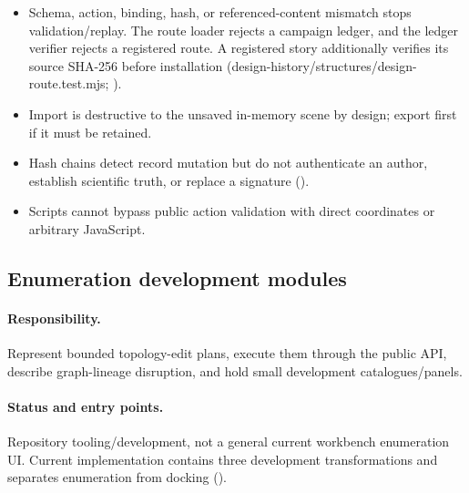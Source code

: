 \documentclass[11pt]{article}
\begin{document}
\begin{small}
\begin{itemize}[leftmargin=*]

\item Schema, action, binding, hash, or referenced-content mismatch stops validation/replay. The route loader rejects a campaign ledger, and the ledger verifier rejects a registered route. A registered story additionally verifies its source SHA-256 before installation (design-history/structures/design-route.test.mjs; ).

\item Import is destructive to the unsaved in-memory scene by design; export first if it must be retained.

\item Hash chains detect record mutation but do not authenticate an author, establish scientific truth, or replace a signature ().

\end{itemize}

\begin{itemize}[leftmargin=*]

\item Scripts cannot bypass public action validation with direct coordinates or arbitrary JavaScript.

\end{itemize}

\subsection{Enumeration development modules}\label{appB:sec20}

\paragraph{Responsibility.}

Represent bounded topology-edit plans, execute them through the public API, describe graph-lineage disruption, and hold small development catalogues/panels.

\paragraph{Status and entry points.}

Repository tooling/development, not a general current workbench enumeration UI. Current implementation contains three development transformations and separates enumeration from docking ().


\end{small}
\end{document}
